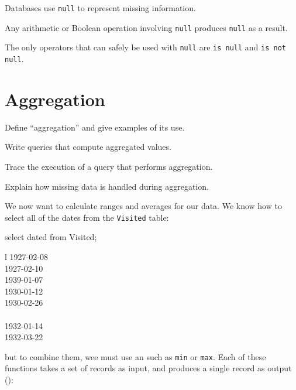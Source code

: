 \begin{keypoints}
\begin{swcitemize}
\item
  Databases use \texttt{null} to represent missing information.
\item
  Any arithmetic or Boolean operation involving \texttt{null} produces
  \texttt{null} as a result.
\item
  The only operators that can safely be used with \texttt{null} are
  \texttt{is null} and \texttt{is not null}.
\end{swcitemize}
\end{keypoints}

\section{Aggregation}

\begin{objectives}
\begin{swcitemize}
\item
  Define ``aggregation'' and give examples of its use.
\item
  Write queries that compute aggregated values.
\item
  Trace the execution of a query that performs aggregation.
\item
  Explain how missing data is handled during aggregation.
\end{swcitemize}
\end{objectives}

We now want to calculate ranges and averages for our data. We know how
to select all of the dates from the \texttt{Visited} table:

\begin{VerbIn}
select dated from Visited;
\end{VerbIn}

\begin{sqltable}{l}
1927-02-08 \\
1927-02-10 \\
1939-01-07 \\
1930-01-12 \\
1930-02-26 \\
~ \\
1932-01-14 \\
1932-03-22 \\
\end{sqltable}

but to combine them, wee must use an
 such as
\texttt{min} or \texttt{max}. Each of these functions takes a set of
records as input, and produces a single record as output
():

